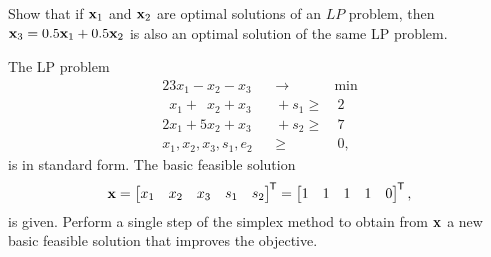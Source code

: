 \begin{subproblem}
    Show that if $\mathbf{x}_1$ and $\mathbf{x}_2$ are optimal solutions of an $LP$ problem, then
    $\mathbf{x}_3 = \num{0.5}\mathbf{x}_1 + \num{0.5}\mathbf{x}_2$ is also an optimal solution of the same LP problem.
\end{subproblem}

\begin{subproblem}
    The LP problem
    \begin{alignat*}{2}
                 3 x_1 -            x_2 - x_3 &&\longrightarrow &\min \\
        \phantom{2}x_1 + \phantom{2}x_2 + x_3 &&{} + s_1 \geq & \ 2 \\
                 2 x_1 +          5 x_2 + x_3 &&{} + s_2 \geq & \ 7 \\
                   x_1,             x_2,  x_3,s_1,e_2 && \geq & \ 0, 
    \end{alignat*}
    is in standard form. The basic feasible solution
    \begin{equation}
        \vx 
        = \mat{x_1 & x_2 & x_3 & s_1 & s_2}\tran 
        = \mat{  1 &   1 &   1 &   1 &   0}\tran,
    \end{equation}
    is given. Perform a single step of the simplex method to obtain from 
    $\mathbf{x}$ a new basic feasible solution that improves the objective.
\end{subproblem}